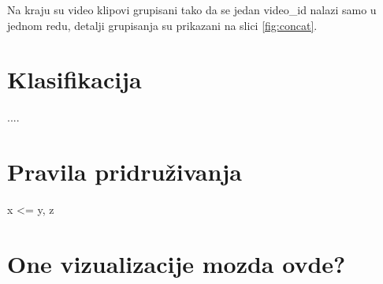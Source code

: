 \documentclass[a4paper]{article}
\theoremstyle{definition}
\begin{document}
Na kraju su video klipovi grupisani tako da se jedan video\_id nalazi samo u jednom redu, detalji grupisanja su prikazani na slici \ref{fig:concat}.


\section{Klasifikacija}
\label{sec:klasifikacija}
....
\section{Pravila pridruživanja}
\label{sec:pravila}

x <= {y, z}

\section{One vizualizacije mozda ovde?}
\label{sec:dod}
\end{document}
